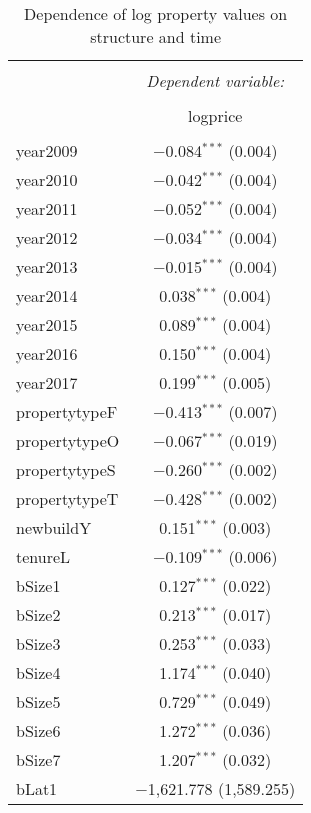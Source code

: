 \documentclass{article}\usepackage[]{graphicx}\usepackage[]{color}
\begin{document}
\begin{table}[!htbp] \centering 
  \caption{Dependence of log property values on structure and time} 
  \label{} 
\begin{tabular}{@{\extracolsep{5pt}}lc} 
\\[-1.8ex]\hline 
\hline \\[-1.8ex] 
 & \multicolumn{1}{c}{\textit{Dependent variable:}} \\ 
\cline{2-2} 
\\[-1.8ex] & logprice \\ 
\hline \\[-1.8ex] 
 year2009 & $-$0.084$^{***}$ (0.004) \\ 
  year2010 & $-$0.042$^{***}$ (0.004) \\ 
  year2011 & $-$0.052$^{***}$ (0.004) \\ 
  year2012 & $-$0.034$^{***}$ (0.004) \\ 
  year2013 & $-$0.015$^{***}$ (0.004) \\ 
  year2014 & 0.038$^{***}$ (0.004) \\ 
  year2015 & 0.089$^{***}$ (0.004) \\ 
  year2016 & 0.150$^{***}$ (0.004) \\ 
  year2017 & 0.199$^{***}$ (0.005) \\ 
  propertytypeF & $-$0.413$^{***}$ (0.007) \\ 
  propertytypeO & $-$0.067$^{***}$ (0.019) \\ 
  propertytypeS & $-$0.260$^{***}$ (0.002) \\ 
  propertytypeT & $-$0.428$^{***}$ (0.002) \\ 
  newbuildY & 0.151$^{***}$ (0.003) \\ 
  tenureL & $-$0.109$^{***}$ (0.006) \\ 
  bSize1 & 0.127$^{***}$ (0.022) \\ 
  bSize2 & 0.213$^{***}$ (0.017) \\ 
  bSize3 & 0.253$^{***}$ (0.033) \\ 
  bSize4 & 1.174$^{***}$ (0.040) \\ 
  bSize5 & 0.729$^{***}$ (0.049) \\ 
  bSize6 & 1.272$^{***}$ (0.036) \\ 
  bSize7 & 1.207$^{***}$ (0.032) \\ 
  bLat1 & $-$1,621.778 (1,589.255) \\ 

\end{tabular}
\end{table}
\end{document}
